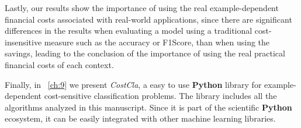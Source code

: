   Lastly, our results show the importance of using the real example-dependent financial costs 
  associated with real-world applications, since there are significant differences in the 
  results when evaluating a model using a traditional cost-insensitive measure such as the 
  accuracy or F1Score,  than when using the savings, leading to the conclusion of the 
  importance of using the real practical financial costs of each context.

  
Finally, in \chaptername{~\ref{ch:9}} we present \textit{CostCla}, a easy to use 
\textbf{Python} library for example-dependent cost-sensitive classification problems. The library 
includes all the algorithms analyzed in this manuscript. Since it is part of the scientific 
\textbf{Python} ecosystem, it can be easily integrated with other machine learning libraries. 
